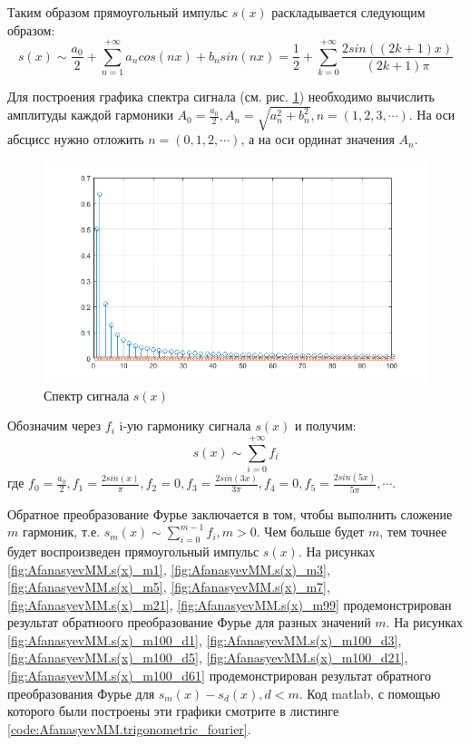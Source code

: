Таким образом прямоугольный импульс $s(x)$ раскладывается следующим образом:
$$
s(x) \sim \frac{a_0}{2} + \sum_{n=1}^{+ \infty}{a_n cos(n x) + b_n sin(n x)}=
\frac{1}{2} + \sum_{k=0}^{+ \infty}{ \frac{2 sin((2 k + 1) x)}{(2 k + 1) \pi}}
$$

Для построения графика спектра сигнала (см. рис. \ref{fig:AfanasyevMM.spectrum})
необходимо вычислить амплитуды каждой гармоники $A_0= \frac{a_0}{2},
A_n= \sqrt{a_n^2+b_n^2}, n=(1,2,3, \cdots)$.
На оси абсцисс нужно отложить $n=(0,1,2, \cdots)$, а на оси ординат значения $A_n$.


\begin{figure}[h]
	\centering
	\includegraphics[width=0.9\linewidth]{AfanasyevMM/img/spectrum}
	\caption{Спектр сигнала $s(x)$}
	\label{fig:AfanasyevMM.spectrum}
\end{figure}


Обозначим через $f_i$ i-ую гармонику сигнала $s(x)$ и получим:
$$
s(x) \sim \sum_{i=0}^{+ \infty}{f_i}
$$
где $f_0= \frac{a_0}{2},
f_1= \frac{2 sin(x)}{ \pi},
f_2= 0,
f_3= \frac{2 sin(3 x)}{3 \pi},
f_4= 0,
f_5= \frac{2 sin(5 x)}{5 \pi},
\cdots$.

Обратное преобразование Фурье заключается в том, чтобы выполнить 
сложение $m$ гармоник, т.е. $s_{m}(x) \sim \sum_{i=0}^{m - 1}{f_i}, m > 0$.
Чем больше будет $m$, тем точнее будет воспроизведен прямоугольный
импульс $s(x)$.
На рисунках
\ref{fig:AfanasyevMM.s(x)_m1}, 
\ref{fig:AfanasyevMM.s(x)_m3},
\ref{fig:AfanasyevMM.s(x)_m5},
\ref{fig:AfanasyevMM.s(x)_m7},
\ref{fig:AfanasyevMM.s(x)_m21},
\ref{fig:AfanasyevMM.s(x)_m99}
продемонстрирован результат обратноого преобразование Фурье для разных
значений $m$.
На рисунках
\ref{fig:AfanasyevMM.s(x)_m100_d1}, 
\ref{fig:AfanasyevMM.s(x)_m100_d3},
\ref{fig:AfanasyevMM.s(x)_m100_d5},
\ref{fig:AfanasyevMM.s(x)_m100_d21},
\ref{fig:AfanasyevMM.s(x)_m100_d61}
продемонстрирован результат обратного преобразования Фурье для
$s_{m}(x) - s_{d}(x), d < m$. Код matlab, с помощью которого
были построены эти графики смотрите в листинге
\ref{code:AfanasyevMM.trigonometric_fourier}.


